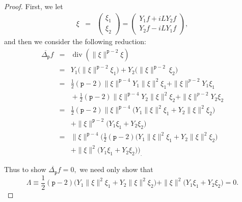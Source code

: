 \documentclass[12pt]{amsart}
\theoremstyle{plain}
\theoremstyle{definition}
\numberwithin{equation}{section}
\begin{document}
\begin{proof}
First, we let
\begin{eqnarray*}
 \xi  & = & \left( \begin{array}{c}
 \xi _1\\
 \xi _2
\end{array} \right)
= \left( \begin{array}{c}
Y_1f+iLY_2f\\
Y_2f-iLY_1f
\end{array} \right),
\end{eqnarray*}
and then we consider the following reduction:
\begin{eqnarray*}
\overline{\Delta_{\texttt{p}}} f & = & {\operatorname{div}}(\| \xi  \|^{{\texttt{p}}-2} \xi ) \\  
& = & Y_1\big(\| \xi \|^{{\texttt{p}}-2} \xi _1\big)+Y_2\big(\| \xi  \|^{{\texttt{p}}-2}\ \xi _2\big)  \\
& = & \frac{1}{2}({\texttt{p}}-2)\| \xi \|^{{\texttt{p}}-4}Y_1\| \xi  \|^{2}\xi _1+\| \xi \|^{p-2}Y_1 \xi _1 \\ 
&  & \mbox{} +\frac{1}{2}({\texttt{p}}-2)\| \xi \|^{{\texttt{p}}-4}Y_2\| \xi  \|^{2} \xi _2+\| \xi \|^{p-2}Y_2 \xi _2\\
& = & \frac{1}{2}({\texttt{p}}-2)\| \xi \|^{{\texttt{p}}-4}\big(Y_1\| \xi  \|^{2} \xi _1+Y_2\| \xi \|^{2} \xi _2\big)\\  
& & \mbox{} +\| \xi \|^{{\texttt{p}}-2}\big(Y_1 \xi _1+Y_2 \xi _2\big)\\   
& = & \| \xi \|^{{\texttt{p}}-4}\Bigg(\frac{1}{2}({\texttt{p}}-2)\big(Y_1\| \xi  \|^{2} \xi _1+Y_2\| \xi \|^{2} \xi _2\big) \\
& & \mbox{} +\| \xi \|^{2}\big(Y_1 \xi _1+Y_2 \xi _2\big)\Bigg)_.  
\end{eqnarray*}

Thus to show $\overline{\Delta_{\texttt{p}}} f=0,$ we need only show that 
\begin{equation*}
\Lambda\equiv\frac{1}{2}({\texttt{p}}-2)\big(Y_1\| \xi \|^{2} \xi _1+Y_2\| \xi \|^{2} \xi _2\big)+\| \xi \|^{2}\big(Y_1 \xi _1+Y_2 \xi _2\big) = 0.
\end{equation*}


\end{proof}
\end{document}
